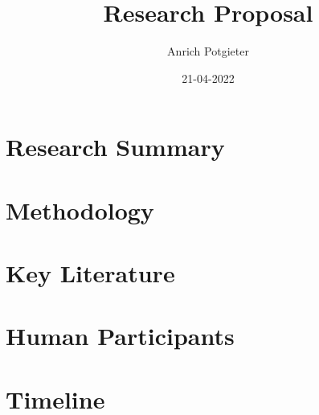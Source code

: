 \documentclass[12pt]{article}
\title{Research Proposal}
\author{Anrich Potgieter}
\date{21-04-2022}
\begin{document}
\maketitle
\tableofcontents

\section{Research Summary}

\section{Methodology}

\section{Key Literature}

\section{Human Participants}

\section{Timeline}
\end{document}
